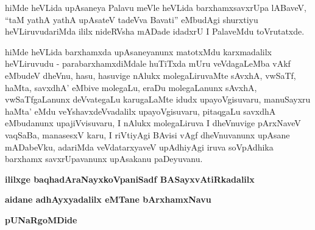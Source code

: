 \begin{artha}
hiMde heVLida upAsaneya Palavu meVle heVLida barxhamxsavxrUpa lABaveV, ``taM yathA yathA upAsateV tadeVva Bavati'' eMbudAgi shurxtiyu heVLiruvudariMda ililx nideRVsha mADade idadxrU I PalaveMdu toVrutatxde.
\end{artha}


\begin{artha}
hiMde heVLida barxhamxda upAsaneyanunx matotxMdu karxmadalilx heVLiruvudu - parabarxhamxdiMdale huTiTxda mUru veVdagaLeMba vAkf eMbudeV dheVnu, hasu, hasuvige nAlukx molegaLiruvaMte sAvxhA, vwSaTf, haMta, savxdhA' eMbive molegaLu, eraDu molegaLanunx sAvxhA, vwSaTfgaLanunx deVvategaLu karugaLaMte idudx upayoVgisuvaru, manuSayxru haMta' eMdu veYshavxdeVvadalilx upayoVgisuvaru, pitaqgaLu savxdhA eMbudanunx upajiVvisuvaru, I nAlukx molegaLiruva I dheVnuvige pArxNaveV vaqSaBa, manasesxV karu, I riVtiyAgi BAvisi vAgf dheVnuvanunx upAsane mADabeVku, adariMda veVdatarxyaveV upAdhiyAgi iruva soVpAdhika barxhamx savxrUpavanunx upAsakanu paDeyuvanu.
\end{artha}

\begin{center}
{\bf ililxge baqhadAraNayxkoVpaniSadf BASayxvAtiRkadalilx}
\smallskip

{\bf aidane adhAyxyadalilx eMTane bArxhamxNavu}

{\bf pUNaRgoMDide}
\end{center}

